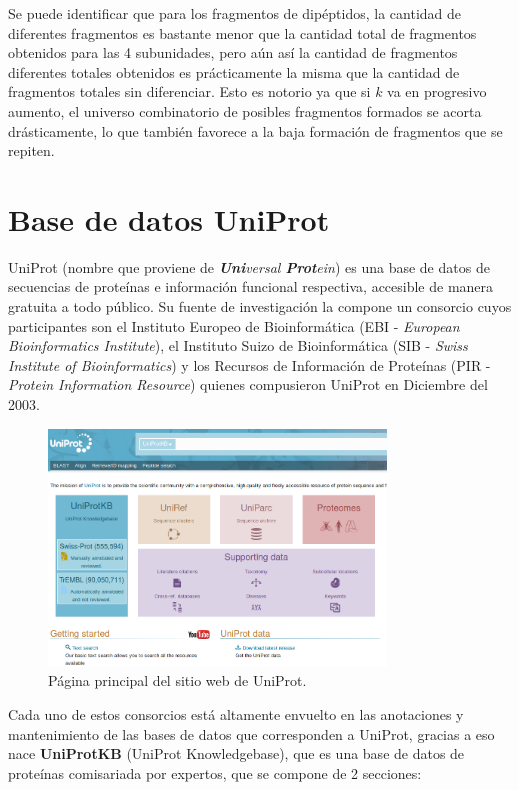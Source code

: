 Se puede identificar que para los fragmentos de dipéptidos, la cantidad de diferentes fragmentos es bastante menor que la cantidad total de fragmentos obtenidos para las 4 subunidades, pero aún así la cantidad de fragmentos diferentes totales obtenidos es prácticamente la misma que la cantidad de fragmentos totales sin diferenciar. Esto es notorio ya que si $k$ va en progresivo aumento, el universo combinatorio de posibles fragmentos formados se acorta drásticamente, lo que también favorece a la baja formación de fragmentos que se repiten.

\section{Base de datos UniProt}

UniProt (nombre que proviene de \textit{\textbf{Uni}versal \textbf{Prot}ein}) es una base de datos de secuencias de proteínas e información funcional respectiva, accesible de manera gratuita a todo público. Su fuente de investigación la compone un consorcio cuyos participantes son el Instituto Europeo de Bioinformática (EBI - \textit{European Bioinformatics Institute}), el Instituto Suizo de Bioinformática (SIB - \textit{Swiss Institute of Bioinformatics}) y los Recursos de Información de Proteínas (PIR - \textit{Protein Information Resource}) quienes compusieron UniProt en Diciembre del 2003.

\begin{figure}[h]
    \centering
    \includegraphics[width=0.8\textwidth]{./images/uniprot_main.png}
    \caption{Página principal del sitio web de UniProt.}
    \label{fig:image7}
\end{figure}

Cada uno de estos consorcios está altamente envuelto en las anotaciones y mantenimiento de las bases de datos que corresponden a UniProt, gracias a eso nace \textbf{UniProtKB} (UniProt Knowledgebase), que es una base de datos de proteínas comisariada por expertos, que se compone de 2 secciones:


